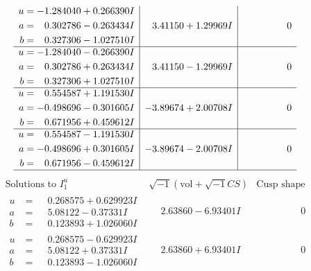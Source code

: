 \documentclass[1p]{elsarticle_modified}
\theoremstyle{definition}
\newcommand{\I}{\sqrt{-1}}
\begin{document}
$$\begin{array}{c|c|c}
\begin{aligned}
u &= -1.284040 + 0.266390 I \\
a &= \phantom{-}0.302786 - 0.263434 I \\
b &= \phantom{-}0.327306 - 1.027510 I\end{aligned}
 & \phantom{-}3.41150 + 1.29969 I & \phantom{-0.000000 } 0 \\ \hline\begin{aligned}
u &= -1.284040 - 0.266390 I \\
a &= \phantom{-}0.302786 + 0.263434 I \\
b &= \phantom{-}0.327306 + 1.027510 I\end{aligned}
 & \phantom{-}3.41150 - 1.29969 I & \phantom{-0.000000 } 0 \\ \hline\begin{aligned}
u &= \phantom{-}0.554587 + 1.191530 I \\
a &= -0.498696 - 0.301605 I \\
b &= \phantom{-}0.671956 + 0.459612 I\end{aligned}
 & -3.89674 + 2.00708 I & \phantom{-0.000000 } 0 \\ \hline\begin{aligned}
u &= \phantom{-}0.554587 - 1.191530 I \\
a &= -0.498696 + 0.301605 I \\
b &= \phantom{-}0.671956 - 0.459612 I\end{aligned}
 & -3.89674 - 2.00708 I & \phantom{-0.000000 } 0\\
 \hline 
 \end{array}$$\newpage$$\begin{array}{c|c|c}  
\text{Solutions to }I^u_{1}& \I (\text{vol} + \sqrt{-1}CS) & \text{Cusp shape}\\
 \hline 
\begin{aligned}
u &= \phantom{-}0.268575 + 0.629923 I \\
a &= \phantom{-}5.08122 - 0.37331 I \\
b &= \phantom{-}0.123893 + 1.026060 I\end{aligned}
 & \phantom{-}2.63860 - 6.93401 I & \phantom{-0.000000 } 0 \\ \hline\begin{aligned}
u &= \phantom{-}0.268575 - 0.629923 I \\
a &= \phantom{-}5.08122 + 0.37331 I \\
b &= \phantom{-}0.123893 - 1.026060 I\end{aligned}
 & \phantom{-}2.63860 + 6.93401 I & \phantom{-0.000000 } 0 \\ \hline\begin{aligned}

\end{aligned}
\end{array}$$
\end{document}
